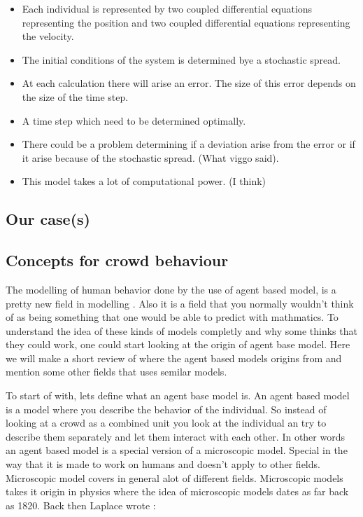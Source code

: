 \begin{itemize}
    \item Each individual is represented by two coupled differential equations 
        representing the position and two coupled differential equations 
        representing the velocity.

    \item The initial conditions of the system is determined bye a stochastic 
        spread.

    \item At each calculation there will arise an error. The size of this 
        error depends on the size of the time step.

    \item A time step which need to be determined optimally.

    \item There could be a problem determining if a deviation arise from the 
        error or if it arise because of the stochastic spread. (What viggo 
        said).

    \item This model takes a lot of computational power. (I think)
\end{itemize}



\subsection{Our case(s)}

\subsection{Concepts for crowd behaviour}
The modelling of human behavior done by the use of agent based model, is a 
pretty new field in modelling \cite{helbing00}. Also it is a field that you 
normally wouldn't think of as being something that one would be able to 
predict with mathmatics. To understand the idea of these kinds of models 
completly and why some thinks that they could work, one could start looking at 
the origin of agent base model. Here we will make a short review of where the 
agent based models origins from and mention some other fields that uses 
semilar models. 

To start of with, lets define what an agent base model is. An agent based 
model is a model where you describe the behavior of the individual. So instead 
of looking at a crowd as a combined unit you look at the individual an try to 
describe them separately and let them interact with each other. In other words 
an agent based model is a special version of a microscopic model.  Special in 
the way that it is made to work on humans and doesn't apply to other fields. 
Microscopic model covers in general alot of different fields. Microscopic 
models takes it origin in physics where the idea of microscopic models dates 
as far back as 1820. Back then Laplace wrote \cite{simintro}:

